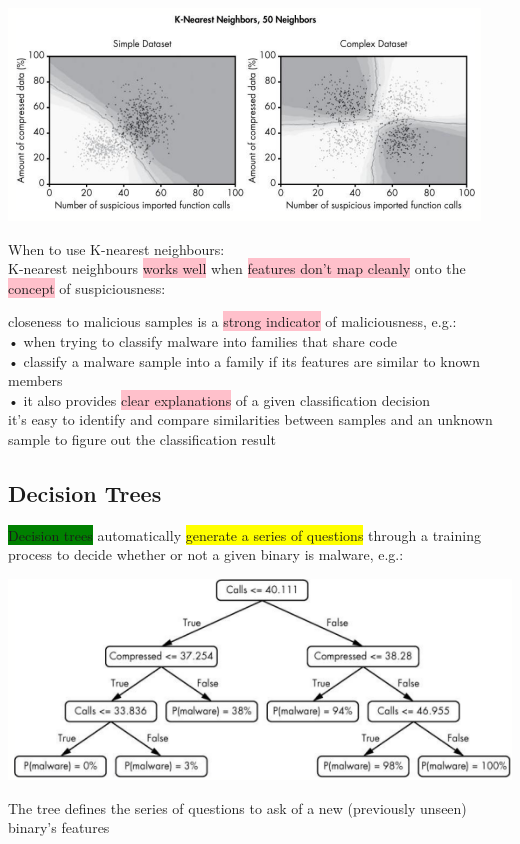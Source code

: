 \documentclass[]{project_plan}
\begin{document}
\includegraphics[width=.8\linewidth]{ml68.png}

When to use K-nearest neighbours:\\
K-nearest neighbours \colorbox{pink}{works well} when \colorbox{pink}{features don’t map cleanly} onto the
\colorbox{pink}{concept} of suspiciousness:\\

\newpage

closeness to malicious samples is a \colorbox{pink}{strong indicator} of maliciousness, e.g.:\\
• when trying to classify malware into families that share code\\
• classify a malware sample into a family if its features are similar to known members\\

• it also provides \colorbox{pink}{clear explanations} of a given classification decision\\
it’s easy to identify and compare similarities between samples and an unknown sample to
figure out the classification result

\subsection{Decision Trees}

\colorbox{green}{Decision trees} automatically \colorbox{yellow}{generate a series of questions} through a training process to
decide whether or not a given binary is malware, e.g.:

\includegraphics[width=.6\linewidth]{ml70.png}

The tree defines the series of questions to ask of a new (previously unseen) binary’s
features
\end{document}
